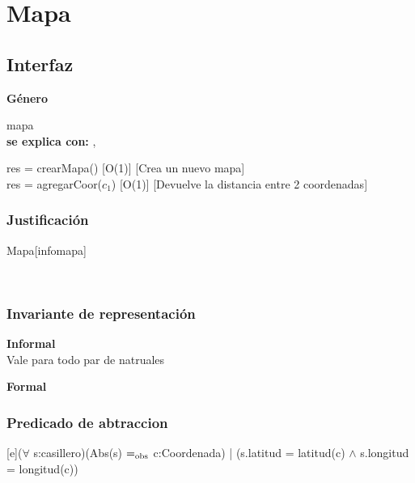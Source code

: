 \section{Mapa}


\subsection{Interfaz}

\parbox {1,7cm}{{\bf Género}} mapa\\
{\bf se explica con:}  , \\
\medskip

{res = crearMapa()}
[O(1)]
[Crea un nuevo mapa]
\\

{res = agregarCoor($c_1$)}
[O(1)]
[Devuelve la distancia entre 2 coordenadas]
\\

\begin{Representacion}
\subsubsection{Justificación}
	\begin{Estructura}{Mapa}[infomapa]
		\begin{Tupla}[infomapa]
			\\
		\end{Tupla}
	\end{Estructura}
	
\subsubsection{Invariante de representación}

\textbf{Informal}\\

Vale para todo par de natruales

\textbf{Formal}\\


\subsubsection{Predicado de abtraccion}

[e]{($\forall$ s:casillero)(Abs(s) $=_{\mathrm{obs}}$ c:Coordenada) | (s.latitud = latitud(c) $\wedge$ s.longitud = longitud(c))}

\end{Representacion}

